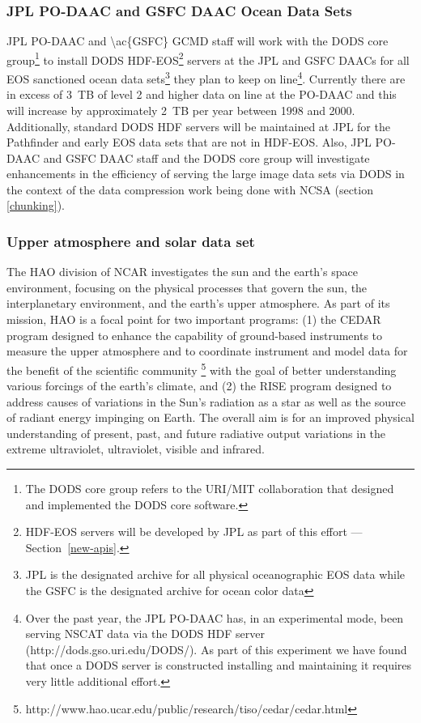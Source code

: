 \documentclass[12pt]{article}
\begin{document}
\subsubsection{\ac{JPL} \ac{PO-DAAC} and \ac{GSFC} \ac{DAAC} Ocean 
Data Sets}\label{daac-data}

\ac{JPL} \ac{PO-DAAC} and \ac{\ac{GSFC}} \ac{GCMD} staff will work 
with the \ac{DODS} core group\footnote{The \ac{DODS} core group refers 
to the \ac{URI}/\ac{MIT} collaboration that designed and implemented 
the \ac{DODS} core software.} to install \ac{DODS} 
\acs{HDF-EOS}\footnote{\acs{HDF-EOS} servers will be developed by
\ac{JPL} as part of this effort --- Section~\ref{new-apis}.}
servers at the \ac{JPL} and \ac{GSFC} \ac{DAAC}s for all \acs{EOS} 
sanctioned ocean data sets\footnote{\ac{JPL} is the designated archive 
for all physical oceanographic \acs{EOS} data while the \ac{GSFC} is 
the designated archive for ocean color data} they plan to keep on 
line\footnote{Over the past year, the \ac{JPL} \ac{PO-DAAC} has, in 
an experimental mode, been serving \ac{NSCAT} data via the \ac{DODS} 
\acs{HDF} server (http://dods.gso.uri.edu/DODS/). As part of
this experiment we have found that once a \ac{DODS} server is constructed
installing and maintaining it requires very little additional effort.}. 
Currently there are in 
excess of 3~TB of level 2 and higher data on line at the \ac{PO-DAAC} 
and this will increase by approximately 2~TB per year between 1998 
and 2000. Additionally, standard \ac{DODS} \acs{HDF} servers will be 
maintained at \ac{JPL} for the Pathfinder and early \acs{EOS} data 
sets that are not in \acs{HDF-EOS}. Also, \ac{JPL} \ac{PO-DAAC} 
and \ac{GSFC} \ac{DAAC} staff and the \ac{DODS} core group will 
investigate enhancements in the efficiency of serving the large image 
data sets via \ac{DODS} in the context of the data compression work 
being done with \ac{NCSA} (section \ref{chunking}).

\subsubsection{Upper atmosphere and solar data set}\label{hao-data} 

The \acl{HAO} division of \ac{NCAR} investigates the sun and the earth's
space environment, focusing on the physical processes that govern the
sun, the interplanetary environment, and the earth's upper atmosphere. 
As part of its mission, \ac{HAO} is a focal point for two important 
programs: (1) the \ac{CEDAR} program designed to enhance the 
capability of ground-based instruments to measure the upper atmosphere 
and to coordinate instrument and model data for the benefit of the 
scientific community
\footnote{http://www.hao.ucar.edu/public/research/tiso/cedar/cedar.html}
with the goal of better understanding various forcings of the earth's 
climate, and (2) the \ac{RISE} program designed to address causes of 
variations in the Sun's radiation as a star as well as the source of 
radiant energy impinging on Earth. The overall aim is for an improved 
physical understanding of present, past, and future radiative output 
variations in the extreme ultraviolet, ultraviolet, visible and 
infrared. 
\end{document}
